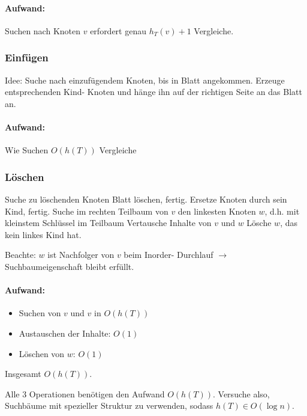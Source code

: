\documentclass[fleqn]{scrartcl}
\begin{document}
\paragraph*{Aufwand:} Suchen nach Knoten $v$ erfordert genau $h_T(v) + 1$ Vergleiche.

\subsubsection{Einfügen}
Idee: Suche nach einzufügendem Knoten, bis in Blatt angekommen. Erzeuge entsprechenden Kind- Knoten und hänge ihn auf der richtigen Seite an das Blatt an.
\paragraph*{Aufwand:} Wie Suchen $O (h(T))$ Vergleiche

\subsubsection{Löschen}
\begin{algorithmic}
\State Suche zu löschenden Knoten
\State Blatt löschen, fertig.
\EndIf
{}
\State Ersetze Knoten durch sein Kind, fertig.
\EndIf
{}
\State Suche im rechten Teilbaum von $v$ den linkesten Knoten $w$, d.h. mit kleinstem Schlüssel im Teilbaum
\State Vertausche Inhalte von $v$ und $w$
\State Lösche $w$, das kein linkes Kind hat.
\EndIf
\end{algorithmic}

Beachte: $w$ ist Nachfolger von $v$ beim Inorder- Durchlauf $\rightarrow$ Suchbaumeigenschaft bleibt erfüllt.

\paragraph*{Aufwand:} \begin{itemize}
\item Suchen von $v$ und $v$ in $O(h(T))$
\item Austauschen der Inhalte: $O(1)$
\item Löschen von $w$: $O(1)$
\end{itemize}
Insgesamt $O(h(T))$.

Alle 3 Operationen benötigen den Aufwand $O(h(T))$. Versuche also, Suchbäume mit spezieller Struktur zu verwenden, sodass $h(T) \in O(\log n)$.

\newpage
\end{document}
